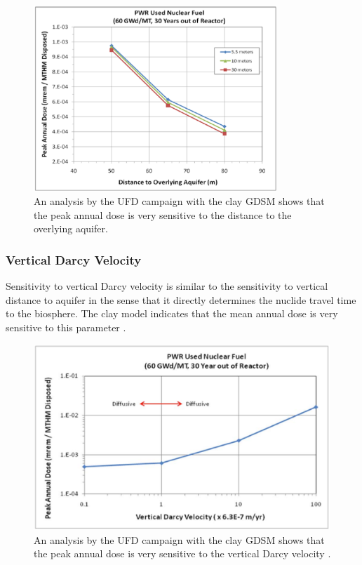 \begin{figure}[h!]
  \begin{center}
    \includegraphics[height=7cm]{./chapters/current/overlyingDist.eps}
  \end{center}
  \caption{An analysis by the UFD campaign with the clay GDSM shows that 
  the peak annual dose is very sensitive to the distance to the overlying 
  aquifer\cite{clayton_generic_2001}.}
  \label{fig:overlyingDist}
\end{figure}
\clearpage


\subsubsection{Vertical Darcy Velocity}

Sensitivity to vertical Darcy velocity is similar to the sensitivity to vertical 
distance to aquifer in the sense that it directly determines the nuclide travel 
time to the biosphere. The clay model indicates that the mean annual dose is 
very sensitive to this parameter \cite{clayton_generic_2011}.


\begin{figure}[h!]
  \begin{center}
    \includegraphics[height=7cm]{./chapters/current/vertDarcyVel.eps}
  \end{center}
  \caption{An analysis by the UFD campaign with the clay GDSM shows that 
  the peak annual dose is very sensitive to the vertical Darcy velocity  
  \cite{clayton_generic_2001}.}
  \label{fig:vertDarcyVel}
\end{figure}

